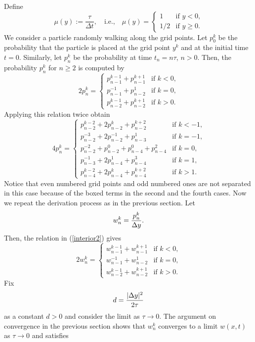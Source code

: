 \documentclass[11pt]{amsart}
\def\d{d}
\begin{document}
Define
\begin{equation}\label{alpha}
\mu(y):=\frac{\tau}{\Delta t},\quad\text{i.e.,}\quad
\mu(y)=
\begin{cases}
1 & \text{if $y<0$,}\\
1/2 & \text{if $y\geq 0$.}
\end{cases}
\end{equation}
We consider a particle randomly walking along the grid points. Let $p_0^k$ be the probability that the particle is placed at the grid point $y^k$ and at the initial time $t=0$. Similarly, let $p_n^k$ be the probability at time $t_n=n\tau$, $n>0$. Then, the probability $p^k_n$ for $n\ge2$ is computed by
\begin{equation}\label{interior2}
2p_n^k=
\begin{cases}
p_{n-1}^{k-1}+p_{n-1}^{k+1} & \text{if $k<0$,}\\
p_{n-1}^{-1}+p_{n-2}^{1} & \text{if $k=0$,}\\
p_{n-2}^{k-1}+p_{n-2}^{k+1} & \text{if $k>0$.}
\end{cases}
\end{equation}
Applying this relation twice obtain
\[
4p_n^k=
\begin{cases}
p_{n-2}^{k-2}+2p_{n-2}^{k}+p_{n-2}^{k+2} & \text{if $k<-1$,}\\
p_{n-2}^{-3}+2p_{n-2}^{-1}+\boxed{p_{n-3}^1} & \text{if $k=-1$,}\\
p_{n-2}^{-2}+p_{n-2}^{0}+p_{n-4}^{0}+p_{n-4}^{2} & \text{if $k=0$,}\\
\boxed{p_{n-3}^{-1}}+2p_{n-4}^{1}+p_{n-4}^3 & \text{if $k=1$,}\\
p_{n-4}^{k-2}+2p_{n-4}^{k}+p_{n-4}^{k+2} & \text{if $k>1$.}
\end{cases}
\]
Notice that even numbered grid points and odd numbered ones are not separated in this case because of the boxed terms in the second and the fourth cases. Now we repeat the derivation process as in the previous section. Let
$$
w_n^k={p_n^k\over \Delta y}.
$$
Then, the relation in (\ref{interior2}) gives
\begin{equation}\label{w}
2w_n^k=
\begin{cases}
w_{n-1}^{k-1}+w_{n-1}^{k+1} & \text{if $k<0$,}\\
w_{n-1}^{-1}+w_{n-2}^{1} & \text{if $k=0$,}\\
w_{n-2}^{k-1}+w_{n-2}^{k+1} & \text{if $k>0$.}
\end{cases}
\end{equation}
Fix
$$
\d={|\Delta y|^2\over 2\tau}
$$
as a constant $\d>0$ and consider the limit as $\tau\to0$. The argument on convergence in the previous section shows that $w_n^k$ converges to a limit $w(x,t)$ as $\tau\to0$ and satisfies
\end{document}
